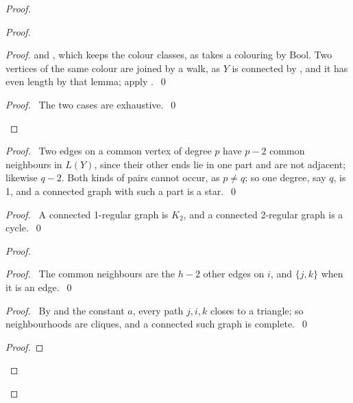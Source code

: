 \begin{proof}
\begin{proof}
\begin{proof}
    and , which keeps the colour classes, as
    takes a colouring by $\mathrm{Bool}$. Two
   vertices of the same colour are joined by a walk, as $Y$ is connected by , and it has
   even length by that lemma; apply .~\qed\end{proof}
  \qedstep
  \begin{proof}\pf\ The two cases are exhaustive.~\qed\end{proof}
 \end{proof}
 \begin{proof}\pf\ Two edges on a common vertex of degree $p$ have $p-2$ common neighbours in
  $L(Y)$, since their other ends lie in one part and are not adjacent; likewise $q-2$. Both
  kinds of pairs cannot occur, as $p\ne q$; so one degree, say $q$, is 1, and a connected graph
  with such a part is a star.~\qed\end{proof}
 \begin{proof}\pf\ A connected 1-regular graph is $K_2$, and a connected 2-regular graph is a
  cycle.~\qed\end{proof}
 \begin{proof}
  \begin{proof}\pf\ The common neighbours are the $h-2$ other edges on $i$, and $\{j,k\}$ when
   it is an edge.~\qed\end{proof}
  \begin{proof}\pf\ By  and the constant $a$, every path $j,i,k$
   closes to a triangle; so neighbourhoods are cliques, and a connected such graph is
   complete.~\qed\end{proof}
  \begin{proof}

\end{proof}
\end{proof}
\end{proof}
